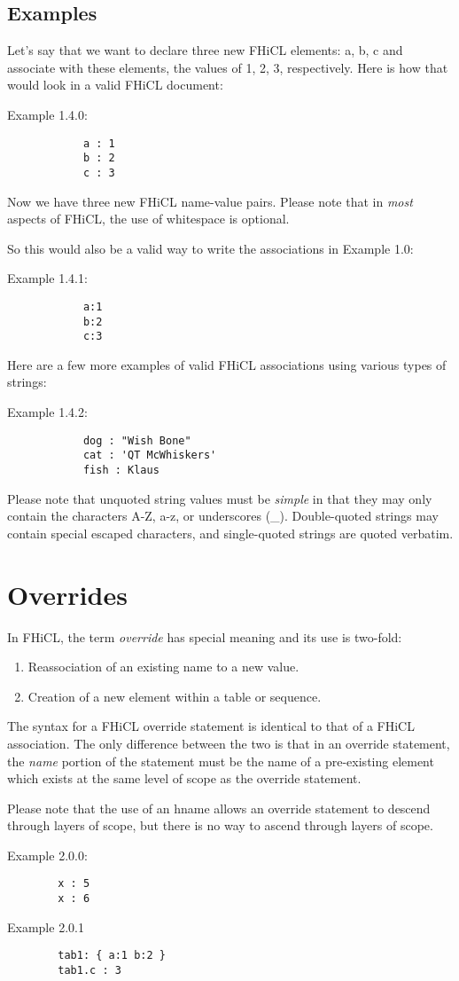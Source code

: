\documentclass{memarticle}
\begin{document}
	\section{Examples}
		Let's say that we want to declare three new FHiCL elements: a, b, c
		and associate with these elements, the values of 1, 2, 3, respectively. 
		Here is how that would look in a valid FHiCL document:
		\par
		Example 1.4.0:
		\begin{verbatim}
			a : 1
			b : 2
			c : 3
		\end{verbatim}
		\par
		Now we have three new FHiCL name-value pairs.
		Please note that in \emph{most} aspects of FHiCL,
		the use of whitespace is optional.
		\par
		So this would also be a valid way to write the associations in Example 1.0:
		\par
		Example 1.4.1:
		\begin{verbatim}
			a:1
			b:2
			c:3
		\end{verbatim} 
 		\par
		Here are a few more examples of valid FHiCL associations using various types of strings:
		\par
		Example 1.4.2:
		\begin{verbatim}
			dog : "Wish Bone"
			cat : 'QT McWhiskers'
			fish : Klaus
		\end{verbatim}
		Please note that unquoted string values must be \emph{simple} in that they may only contain
		the characters A-Z, a-z, or underscores (\_).
		Double-quoted strings may contain special escaped characters,
		and single-quoted strings are quoted verbatim.
\chapter{Overrides}
	In FHiCL, the term \emph{override} has special meaning and its use is two-fold:
	\begin{enumerate}
		\item Reassociation of an existing name to a new value.
		\item Creation of a new element within a table or sequence.
	\end{enumerate}
	\par
	The syntax for a FHiCL override statement is identical to that of a FHiCL association.
	The only difference between the two is that in an override statement,
	the \emph{name} portion of the statement must be the name of a pre-existing element
	which exists at the same level of scope as the override statement.
	\par
	Please note that the use of an hname allows an override statement to descend through layers of scope,
	but there is no way to ascend through layers of scope.
	\par
	Example 2.0.0:
	\begin{verbatim}
		x : 5
		x : 6
	\end{verbatim}
	\par
	Example 2.0.1
	\begin{verbatim}
		tab1: { a:1 b:2 }
		tab1.c : 3
	\end{verbatim}
\end{document}
